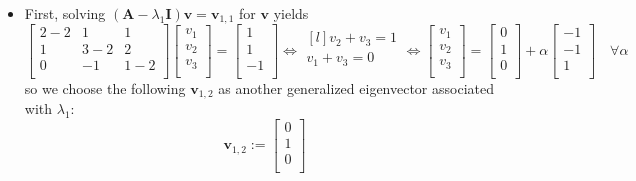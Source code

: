 \documentclass[12pt,a4paper]{article}
\begin{document}
\begin{itemize}
\begin{itemize}
  \item First, solving $(\bm{A}-\lambda_{1}\bm{I})\bm{v} = \bm{v}_{1,1}$ for $\bm{v}$ yields
    \begin{equation}\nonumber%
      \begin{bmatrix}
        2-2 & 1 & 1 \\
        1 & 3-2 & 2 \\
        0 & -1 & 1-2 \\
      \end{bmatrix}
      \begin{bmatrix}
        v_{1} \\
        v_{2} \\
        v_{3} \\
      \end{bmatrix}
      = 
      \begin{bmatrix}
        1 \\
        1 \\
        -1 \\
      \end{bmatrix}
      \iff
      \begin{matrix*}[l]
        v_{2} + v_{3} = 1 \\
        v_{1} + v_{3} = 0 \\
      \end{matrix*}
      \iff
      \begin{bmatrix}
        v_{1} \\
        v_{2} \\
        v_{3} \\
      \end{bmatrix}
      =
      \begin{bmatrix}
        0 \\
        1 \\
        0 \\
      \end{bmatrix}
      +
      \alpha
      \begin{bmatrix}
        -1 \\
        -1 \\
        1 \\
      \end{bmatrix}
      \quad \forall \alpha
    \end{equation}
    so we choose the following $\bm{v}_{1,2}$ as another generalized eigenvector associated with $\lambda_{1}$:
    \begin{equation}\nonumber%
      \bm{v}_{1,2} :=
      \begin{bmatrix}
        0 \\
        1 \\
        0 \\
      \end{bmatrix}
    \end{equation}


\end{itemize}
\end{itemize}
\end{document}
